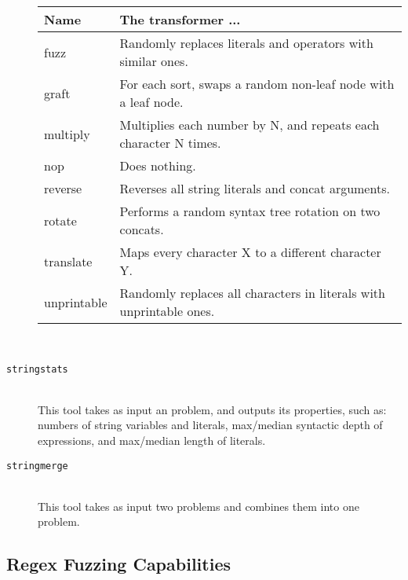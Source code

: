 \begin{description}
            \begin{tabular}{|l|l|}
                \hline
                \textbf{Name} & \textbf{The transformer ...} \\ \hline
                fuzz          & Randomly replaces literals and operators with similar ones. \\ \hline
                graft         & For each sort, swaps a random non-leaf node with a leaf node. \\ \hline
                multiply      & Multiplies each number by N, and repeats each character N times. \\ \hline
                nop           & Does nothing. \\ \hline
                reverse       & Reverses all string literals and concat arguments. \\ \hline
                rotate        & Performs a random syntax tree rotation on two concats. \\ \hline
                translate     & Maps every character X to a different character Y. \\ \hline
                unprintable   & Randomly replaces all characters in literals with unprintable ones. \\ \hline
            \end{tabular}

            \hfill \\

        \item[\texttt{stringstats}] \hfill \\
            This tool takes as input an \smt{} problem, and outputs its properties, such as: numbers of string variables and literals, max/median syntactic depth of expressions, and max/median length of literals.

            \hfill

        \item[\texttt{stringmerge}] \hfill \\
            This tool takes as input two \smt{} problems and combines them into one problem.


    \end{description}

    \subsection{Regex Fuzzing Capabilities}

